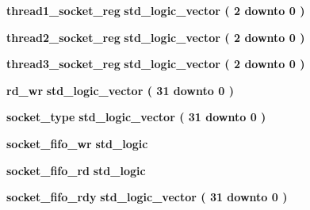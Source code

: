 \begin{DoxyCompactItemize}
{\bf thread1\+\_\+socket\+\_\+reg} {\bfseries \textcolor{comment}{std\+\_\+logic\+\_\+vector}\textcolor{vhdlchar}{ }\textcolor{vhdlchar}{(}\textcolor{vhdlchar}{ }\textcolor{vhdlchar}{ } \textcolor{vhdldigit}{2} \textcolor{vhdlchar}{ }\textcolor{keywordflow}{downto}\textcolor{vhdlchar}{ }\textcolor{vhdlchar}{ } \textcolor{vhdldigit}{0} \textcolor{vhdlchar}{ }\textcolor{vhdlchar}{)}\textcolor{vhdlchar}{ }} 
\item 
{\bf thread2\+\_\+socket\+\_\+reg} {\bfseries \textcolor{comment}{std\+\_\+logic\+\_\+vector}\textcolor{vhdlchar}{ }\textcolor{vhdlchar}{(}\textcolor{vhdlchar}{ }\textcolor{vhdlchar}{ } \textcolor{vhdldigit}{2} \textcolor{vhdlchar}{ }\textcolor{keywordflow}{downto}\textcolor{vhdlchar}{ }\textcolor{vhdlchar}{ } \textcolor{vhdldigit}{0} \textcolor{vhdlchar}{ }\textcolor{vhdlchar}{)}\textcolor{vhdlchar}{ }} 
\item 
{\bf thread3\+\_\+socket\+\_\+reg} {\bfseries \textcolor{comment}{std\+\_\+logic\+\_\+vector}\textcolor{vhdlchar}{ }\textcolor{vhdlchar}{(}\textcolor{vhdlchar}{ }\textcolor{vhdlchar}{ } \textcolor{vhdldigit}{2} \textcolor{vhdlchar}{ }\textcolor{keywordflow}{downto}\textcolor{vhdlchar}{ }\textcolor{vhdlchar}{ } \textcolor{vhdldigit}{0} \textcolor{vhdlchar}{ }\textcolor{vhdlchar}{)}\textcolor{vhdlchar}{ }} 
\item 
{\bf rd\+\_\+wr} {\bfseries \textcolor{comment}{std\+\_\+logic\+\_\+vector}\textcolor{vhdlchar}{ }\textcolor{vhdlchar}{(}\textcolor{vhdlchar}{ }\textcolor{vhdlchar}{ } \textcolor{vhdldigit}{31} \textcolor{vhdlchar}{ }\textcolor{keywordflow}{downto}\textcolor{vhdlchar}{ }\textcolor{vhdlchar}{ } \textcolor{vhdldigit}{0} \textcolor{vhdlchar}{ }\textcolor{vhdlchar}{)}\textcolor{vhdlchar}{ }} 
\item 
{\bf socket\+\_\+type} {\bfseries \textcolor{comment}{std\+\_\+logic\+\_\+vector}\textcolor{vhdlchar}{ }\textcolor{vhdlchar}{(}\textcolor{vhdlchar}{ }\textcolor{vhdlchar}{ } \textcolor{vhdldigit}{31} \textcolor{vhdlchar}{ }\textcolor{keywordflow}{downto}\textcolor{vhdlchar}{ }\textcolor{vhdlchar}{ } \textcolor{vhdldigit}{0} \textcolor{vhdlchar}{ }\textcolor{vhdlchar}{)}\textcolor{vhdlchar}{ }} 
\item 
{\bf socket\+\_\+fifo\+\_\+wr} {\bfseries \textcolor{comment}{std\+\_\+logic}\textcolor{vhdlchar}{ }} 
\item 
{\bf socket\+\_\+fifo\+\_\+rd} {\bfseries \textcolor{comment}{std\+\_\+logic}\textcolor{vhdlchar}{ }} 
\item 
{\bf socket\+\_\+fifo\+\_\+rdy} {\bfseries \textcolor{comment}{std\+\_\+logic\+\_\+vector}\textcolor{vhdlchar}{ }\textcolor{vhdlchar}{(}\textcolor{vhdlchar}{ }\textcolor{vhdlchar}{ } \textcolor{vhdldigit}{31} \textcolor{vhdlchar}{ }\textcolor{keywordflow}{downto}\textcolor{vhdlchar}{ }\textcolor{vhdlchar}{ } \textcolor{vhdldigit}{0} \textcolor{vhdlchar}{ }\textcolor{vhdlchar}{)}\textcolor{vhdlchar}{ }} 

\end{DoxyCompactItemize}
